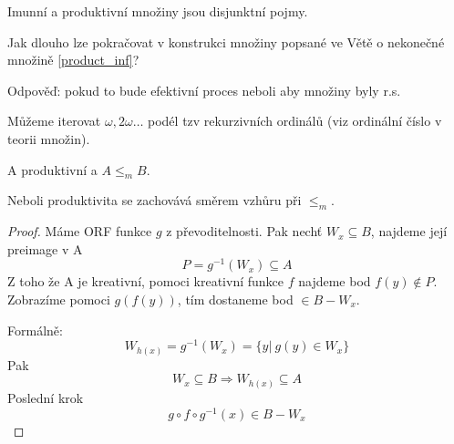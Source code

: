 \begin{note}
	Imunní a produktivní množiny jsou disjunktní pojmy.
\end{note}

\begin{amendment}
	Jak dlouho lze pokračovat v konstrukci množiny popsané ve Větě o nekonečné množině \cref{product_inf}?

	Odpověď: pokud to bude efektivní proces neboli aby množiny byly r.s.

	Můžeme iterovat $\omega, 2 \omega \ldots$ podél tzv rekurzivních ordinálů (viz ordinální číslo v teorii množin).
\end{amendment}

\begin{lemma}\label{prod_prev}
	A produktivní a $A \leq_m B$.

	Neboli produktivita se zachovává směrem vzhůru při $\leq_m$.
\end{lemma}
\begin{proof}
	Máme ORF funkce $g$ z převoditelnosti.
	Pak nechť $W_x \subseteq B$, najdeme její preimage v A
	\[ P = g^{-1}(W_x) \subseteq A \]
	Z toho že A je kreativní, pomoci kreativní funkce $f$ najdeme bod $f(y) \notin P$.
	Zobrazíme pomoci $g(f(y))$, tím dostaneme bod $\in B - W_x$.

	Formálně:
	\[ W_{h(x)} = g^{-1}(W_x) = \{ y |\ g(y) \in W_x \} \]
	Pak
	\[ W_x \subseteq B \Rightarrow W_{h(x)} \subseteq A \]
	Poslední krok
	\[ g \circ f \circ g^{-1} (x) \in B - W_x \]

\end{proof}

